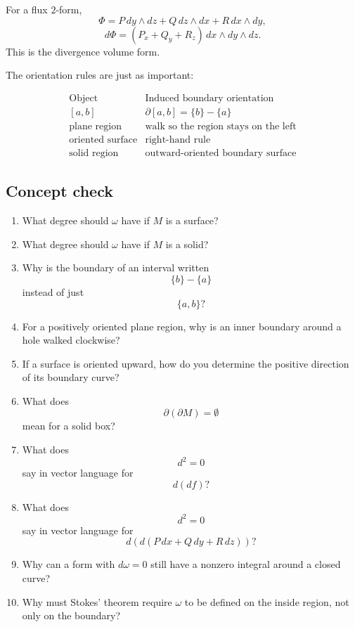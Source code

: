 For a flux \(2\)-form,
\[
    \Phi=P\,dy\wedge dz+Q\,dz\wedge dx+R\,dx\wedge dy,
\]
\[
\boxed{
    d\Phi=(P_x+Q_y+R_z)\,dx\wedge dy\wedge dz.
}
\]
This is the divergence volume form.

The orientation rules are just as important:

\[
\begin{array}{c|c}
\text{Object} & \text{Induced boundary orientation} \\ \hline
[a,b] & \partial[a,b]=\{b\}-\{a\}\\[1mm]
\text{plane region} & \text{walk so the region stays on the left}\\[1mm]
\text{oriented surface} & \text{right-hand rule}\\[1mm]
\text{solid region} & \text{outward-oriented boundary surface}
\end{array}
\]

\subsection{Concept check}

\begin{enumerate}
\item What degree should \(\omega\) have if \(M\) is a surface?

\item What degree should \(\omega\) have if \(M\) is a solid?

\item Why is the boundary of an interval written
\[
    \{b\}-\{a\}
\]
instead of just
\[
    \{a,b\}?
\]

\item For a positively oriented plane region, why is an inner boundary around a hole
walked clockwise?

\item If a surface is oriented upward, how do you determine the positive direction of
its boundary curve?

\item What does
\[
    \partial(\partial M)=\emptyset
\]
mean for a solid box?

\item What does
\[
    d^2=0
\]
say in vector language for
\[
    d(df)?
\]

\item What does
\[
    d^2=0
\]
say in vector language for
\[
    d(d(P\,dx+Q\,dy+R\,dz))?
\]

\item Why can a form with \(d\omega=0\) still have a nonzero integral around a closed
curve?

\item Why must Stokes' theorem require \(\omega\) to be defined on the inside region,
not only on the boundary?
\end{enumerate}

